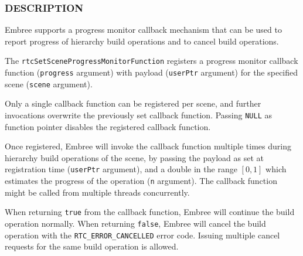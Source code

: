 \begin{Shaded}
\begin{Highlighting}[]

  \OperatorTok{(*}\OperatorTok{)(}
  \OperatorTok{*}\OperatorTok{,}
\OperatorTok{);}

\OperatorTok{(}
\OperatorTok{,}
\OperatorTok{,}
  \OperatorTok{*}
\OperatorTok{);}
\end{Highlighting}
\end{Shaded}

\subsubsection{DESCRIPTION}\label{description}

Embree supports a progress monitor callback mechanism that can be used
to report progress of hierarchy build operations and to cancel build
operations.

The \texttt{rtcSetSceneProgressMonitorFunction} registers a progress
monitor callback function (\texttt{progress} argument) with payload
(\texttt{userPtr} argument) for the specified scene (\texttt{scene}
argument).

Only a single callback function can be registered per scene, and further
invocations overwrite the previously set callback function. Passing
\texttt{NULL} as function pointer disables the registered callback
function.

Once registered, Embree will invoke the callback function multiple times
during hierarchy build operations of the scene, by passing the payload
as set at registration time (\texttt{userPtr} argument), and a double in
the range \([0, 1]\) which estimates the progress of the operation
(\texttt{n} argument). The callback function might be called from
multiple threads concurrently.

When returning \texttt{true} from the callback function, Embree will
continue the build operation normally. When returning \texttt{false},
Embree will cancel the build operation with the
\texttt{RTC\_ERROR\_CANCELLED} error code. Issuing multiple cancel
requests for the same build operation is allowed.

